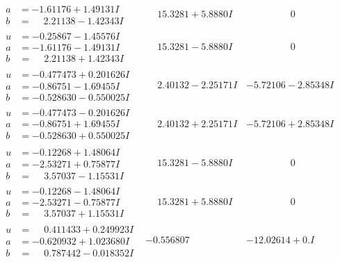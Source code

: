 \documentclass[1p]{elsarticle_modified}
\theoremstyle{definition}
\begin{document}
$$\begin{array}{c|c|c}
\begin{aligned}
a &= -1.61176 + 1.49131 I \\
b &= \phantom{-}2.21138 - 1.42343 I\end{aligned}
 & \phantom{-}15.3281 + 5.8880 I & \phantom{-0.000000 } 0 \\ \hline\begin{aligned}
u &= -0.25867 - 1.45576 I \\
a &= -1.61176 - 1.49131 I \\
b &= \phantom{-}2.21138 + 1.42343 I\end{aligned}
 & \phantom{-}15.3281 - 5.8880 I & \phantom{-0.000000 } 0 \\ \hline\begin{aligned}
u &= -0.477473 + 0.201626 I \\
a &= -0.86751 - 1.69455 I \\
b &= -0.528630 - 0.550025 I\end{aligned}
 & \phantom{-}2.40132 - 2.25171 I & -5.72106 - 2.85348 I \\ \hline\begin{aligned}
u &= -0.477473 - 0.201626 I \\
a &= -0.86751 + 1.69455 I \\
b &= -0.528630 + 0.550025 I\end{aligned}
 & \phantom{-}2.40132 + 2.25171 I & -5.72106 + 2.85348 I \\ \hline\begin{aligned}
u &= -0.12268 + 1.48064 I \\
a &= -2.53271 + 0.75877 I \\
b &= \phantom{-}3.57037 - 1.15531 I\end{aligned}
 & \phantom{-}15.3281 - 5.8880 I & \phantom{-0.000000 } 0 \\ \hline\begin{aligned}
u &= -0.12268 - 1.48064 I \\
a &= -2.53271 - 0.75877 I \\
b &= \phantom{-}3.57037 + 1.15531 I\end{aligned}
 & \phantom{-}15.3281 + 5.8880 I & \phantom{-0.000000 } 0 \\ \hline\begin{aligned}
u &= \phantom{-}0.411433 + 0.249923 I \\
a &= -0.620932 + 1.023680 I \\
b &= \phantom{-}0.787442 - 0.018352 I\end{aligned}
 & -0.556807\phantom{ +0.000000I} & -12.02614 + 0. I\phantom{ +0.000000I} \\ \hline\begin{aligned}

\end{aligned}
\end{array}$$
\end{document}
